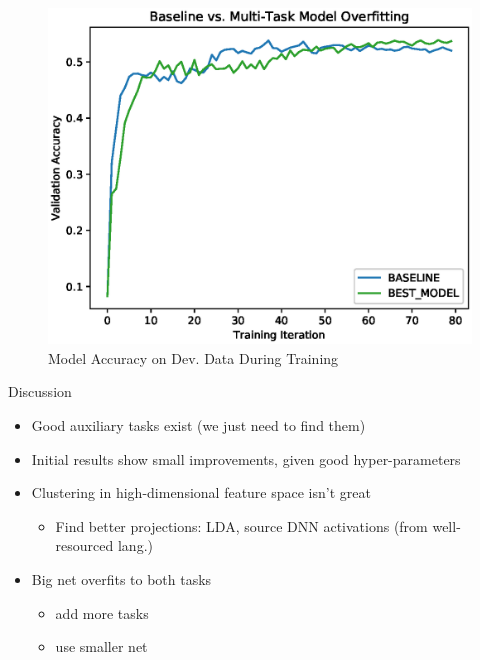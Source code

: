 \documentclass[final]{beamer} %
\begin{document}
\begin{frame}
\begin{columns}
\begin{column}{0.3\textwidth}
{        \vfill

        \begin{figure}[!htbp]
          \centering
          \minipage{\textwidth}
          \centering
          \includegraphics[width=.8\linewidth]{figs/dev_during_training.eps}
          \caption{Model Accuracy on Dev. Data During Training}
          \endminipage\hfill
        \end{figure}

        \vfill
        
                \begin{block}{\boxnumber Discussion}
          \begin{itemize}
          \item Good auxiliary tasks exist (we just need to find them)
          \item Initial results show small improvements, given good hyper-parameters
          \item Clustering in high-dimensional feature space isn't great
                  \begin{itemize}
                  \item Find better projections: LDA, source DNN activations (from well-resourced lang.)
                  \end{itemize}
                \item Big net overfits to both tasks
                            \begin{itemize}
                            \item add more tasks
                            \item use smaller net
                            \end{itemize}
          \end{itemize}
        \end{block}        

}
\end{column}
\end{columns}
\end{frame}
\end{document}
